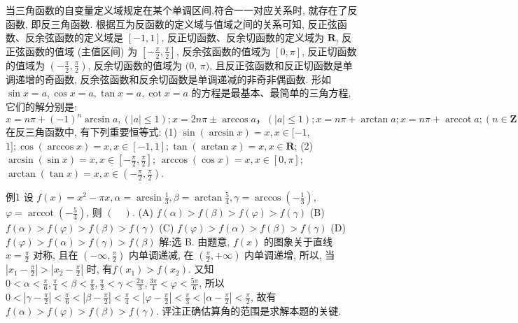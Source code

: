 
当三角函数的自变量定义域规定在某个单调区间,符合一一对应关系时, 就存在了反函数, 即反三角函数.
根据互为反函数的定义域与值域之间的关系可知, 反正弦函数、反余弦函数的定义域是 $[-1,1]$, 反正切函数、反余切函数的定义域为 $\mathbf{R}$, 反正弦函数的值域 (主值区间) 为 $\left[-\frac{\pi}{2}, \frac{\pi}{2}\right]$, 反余弦函数的值域为 $[0, \pi]$, 反正切函数的值域为 $\left(-\frac{\pi}{2}, \frac{\pi}{2}\right)$, 反余切函数的值域为 $(0$, $\pi)$, 且反正弦函数和反正切函数是单调递增的奇函数, 反余弦函数和反余切函数是单调递减的非奇非偶函数.
形如 $\sin x=a, \cos x=a, \tan x=a, \cot x=a$ 的方程是最基本、最简单的三角方程, 它们的解分别是: $x=n \pi+(-1)^n \arcsin a,(|a| \leqslant 1) ; x= 2 n \pi \pm \arccos a ，(|a| \leqslant 1) ; x=n \pi+\arctan a ; x=n \pi+\operatorname{arccot} a ;(n \in \mathbf{Z})$
在反三角函数中, 有下列重要恒等式: (1) $\sin (\arcsin x)=x, x \in[-1$, $1] ; \cos (\arccos x)=x, x \in[-1,1] ; \tan (\arctan x)=x, x \in \mathbf{R}$;
(2) $\arcsin (\sin x)=x, x \in\left[-\frac{\pi}{2}, \frac{\pi}{2}\right]$; $\arccos (\cos x)=x, x \in[0, \pi]$; $\arctan (\tan x)=x, x \in\left(-\frac{\pi}{2}, \frac{\pi}{2}\right)$.



例1 设 $f(x)=x^2-\pi x, \alpha=\arcsin \frac{1}{3}, \beta=\arctan \frac{5}{4}, \gamma=\arccos \left(-\frac{1}{3}\right)$, $\varphi=\operatorname{arccot}\left(-\frac{5}{4}\right)$, 则 $(\quad)$.
(A) $f(\alpha)>f(\beta)>f(\varphi)>f(\gamma)$
(B) $f(\alpha)>f(\varphi)>f(\beta)>f(\gamma)$
(C) $f(\varphi)>f(\alpha)>f(\beta)>f(\gamma)$
(D) $f(\varphi)>f(\alpha)>f(\gamma)>f(\beta)$
解:选 B. 由题意, $f(x)$ 的图象关于直线 $x=\frac{\pi}{2}$ 对称, 且在 $\left(-\infty, \frac{\pi}{2}\right)$ 内单调递减, 在 $\left(\frac{\pi}{2},+\infty\right)$ 内单调递增, 所以, 当 $\left|x_1-\frac{\pi}{2}\right|>\left|x_2-\frac{\pi}{2}\right|$ 时, 有$f\left(x_1\right)>f\left(x_2\right)$.
又知 $0<\alpha<\frac{\pi}{6}, \frac{\pi}{4}<\beta<\frac{\pi}{3}, \frac{\pi}{2}<\gamma<\frac{2 \pi}{3}, \frac{3 \pi}{4}<\varphi<\frac{5 \pi}{6}$, 所以 $0< \left|\gamma-\frac{\pi}{2}\right|<\frac{\pi}{6}<\left|\beta-\frac{\pi}{2}\right|<\frac{\pi}{4}<\left|\varphi-\frac{\pi}{2}\right|<\frac{\pi}{3}<\left|\alpha-\frac{\pi}{2}\right|<\frac{\pi}{2}$, 故有 $f(\alpha)>f(\varphi)>f(\beta)>f(\gamma)$.
评注正确估算角的范围是求解本题的关键.




